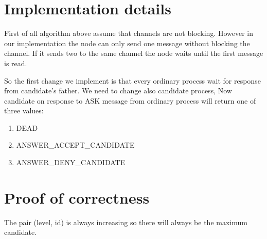 \documentclass{article}
\begin{document}
\section*{Implementation details}
First of all algorithm above assume that channels are not blocking. However in our implementation the node can only send one message without blocking the channel. If it sends two to the same channel the node waits until the first message is read.

So the first change we implement is that every ordinary process wait for response from candidate's father. We need to change also candidate process, Now candidate on response to ASK message from ordinary process will return one of three values:
\begin{enumerate}
    \item DEAD 
    \item ANSWER\_ACCEPT\_CANDIDATE 
    \item ANSWER\_DENY\_CANDIDATE
\end{enumerate}

\section*{Proof of correctness}
The pair (level, id) is always increasing so there will always be the maximum candidate.
\end{document}
